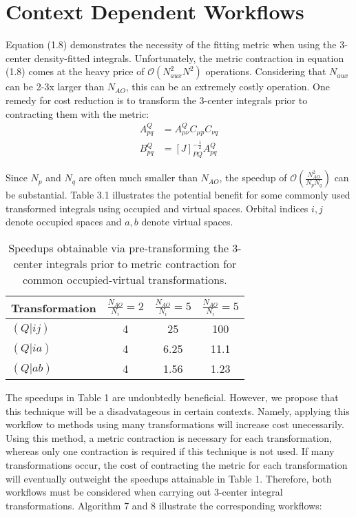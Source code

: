 \section{Context Dependent Workflows}

Equation (1.8) demonstrates the necessity of the fitting metric when using the 3-center density-fitted integrals. Unfortunately, the
metric contraction in equation (1.8) comes at the heavy price of $\mathcal{O}(N_{aux}^2N^2)$ operations.
Considering that $N_{aux}$ can be 2-3x larger
than $N_{AO}$, this can be an extremely costly operation. One remedy for cost reduction is to transform the 3-center integrals prior to contracting
them with the metric:
\begin{align} 
A_{p q}^Q &= A_{\mu \nu}^Q C_{\mu p}C_{\nu q} \\
B_{pq}^Q &= [J]_{PQ}^{-\frac{1}{2}}A_{p q}^Q
\end{align}
 
\noindent Since $N_p$ and $N_q$ are often much smaller than $N_{AO}$, the speedup of 
$\mathcal{O}(\frac{N_{AO}^2}{N_pN_q})$ can be substantial. 
Table 3.1 illustrates the potential benefit for some commonly used transformed integrals using occupied and virtual spaces.
Orbital indices $i,j$ denote occupied spaces and $a,b$ denote virtual spaces.

\begingroup
\begin{table}[H]
\centering
\renewcommand{\baselinestretch}{1}
\caption{Speedups obtainable via pre-transforming the 3-center integrals prior to metric contraction for common occupied-virtual transformations.}
\begin{tabular}{l c c c}
\multicolumn{1}{l}{\textbf{Transformation}} &
\multicolumn{1}{c}{\textbf{$\frac{N_{AO}}{N_i}=2$}} & 
\multicolumn{1}{c}{\textbf{$\frac{N_{AO}}{N_i}=5$}} & 
\multicolumn{1}{c}{\textbf{$\frac{N_{AO}}{N_i}=5$}} \\ 
\hline
$(Q|ij)$       & 4               & 25              & 100      \\ 
$(Q|ia)$       & 4               & 6.25            & 11.1     \\ 
$(Q|ab)$        & 4              & 1.56            & 1.23     \\
\end{tabular}
\end{table}
\endgroup

The speedups in Table 1 are undoubtedly beneficial. However, we propose that this technique 
will be a disadvatageous in certain contexts. 
Namely, applying this workflow to methods using many transformations will increase cost unecessarily. 
Using this method, a metric contraction is necessary for each transformation, whereas only one contraction is required if this technique is not used.
If many transformations occur, the cost of contracting the metric for 
each transformation will eventually outweight the speedups attainable in Table 1. Therefore, both workflows must be considered when carrying
out 3-center integral transformations. Algorithm 7 and 8 illustrate the corresponding workflows:

